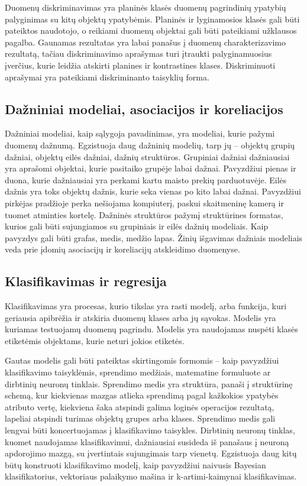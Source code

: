 Duomenų diskriminavimas yra planinės klasės duomenų pagrindinių ypatybių palyginimas su kitų objektų ypatybėmis.
Planinės ir lyginamosios klasės gali būti pateiktos naudotojo, o reikiami duomenų objektai gali būti pateikiami užklausos pagalba.
Gaunamas rezultatas yra labai panašus į duomenų charakterizavimo rezultatą, tačiau diskriminavimo aprašymas turi įtraukti palyginamuosius įverčius, kurie leidžia atskirti planines ir kontrastines klases.
Diskriminuoti aprašymai yra pateikiami diskriminanto taisyklių forma.

\subsection{Dažniniai modeliai, asociacijos ir koreliacijos}

Dažniniai modeliai, kaip sąlygoja pavadinimas, yra modeliai, kurie pažymi duomenų dažnumą.
Egzistuoja daug dažninių modelių, tarp jų -- objektų grupių dažniai, objektų eilės dažniai, dažnių struktūros. 
Grupiniai dažniai dažniausiai yra aprašomi objektai, kurie pasitaiko grupėje labai dažnai.
Pavyzdžiui pienas ir duona, kurie dažniausiai yra perkami kartu maisto prekių parduotuvėje.
Eilės dažnis yra toks objektų dažnis, kurie seka vienas po kito labai dažnai.
Pavyzdžiui pirkėjas pradžioje perka nešiojama kompiuterį, paskui skaitmeninę kamerą ir tuomet atminties kortelę.
Dažninės struktūros pažymį struktūrines formatas, kurios gali būti sujungiamos su grupiniais ir eilės dažnių modeliais. 
Kaip pavyzdys gali būti grafas, medis, medžio lapas.
Žinių išgavimas dažniais modeliais veda prie įdomių asociacijų ir koreliacijų atskleidimo duomenyse.

\subsection{Klasifikavimas ir regresija}

Klasifikavimas yra procesas, kurio tikslas yra rasti modelį, arba funkcija, kuri geriausia apibrėžia ir atskiria duomenų klases arba jų sąvokas.
Modelis yra kuriamas testuojamų duomenų pagrindu. 
Modelis yra naudojamas nuspėti klasės etiketėmis objektams, kurie neturi jokios etiketės.

Gautas modelis gali būti pateiktas skirtingomis formomis -- kaip pavyzdžiui klasifikavimo taisyklėmis, sprendimo medžiais, matematine formuluote ar dirbtinių neuronų tinklais.
Sprendimo medis yra struktūra, panaši į struktūrinę schemą, kur kiekvienas mazgas atlieka sprendimą pagal kažkokios ypatybės atributo vertę, kiekviena šaka atspindi galima loginės operacijos rezultatą, lapeliai atspindi turimas objektų grupes arba klases.
Sprendimo medis gali lengvai būti koncertuojamas į klasifikavimo taisykles.
Dirbtinių neuronų tinklas, kuomet naudojamas klasifikavimui, dažniausiai susideda iš panašaus į neuroną apdorojimo mazgą, su įvertintais sujungimais tarp vienetų.
Egzistuoja daug kitų būtų konstruoti klasifikavimo modelį, kaip pavyzdžiui naivusis Bayesian klasifikatorius, vektoriaus palaikymo mašina ir k-artimi-kaimynai klasifikavimas.

